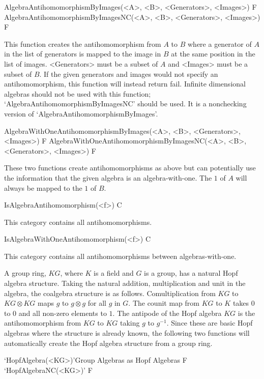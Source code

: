 \>AlgebraAntihomomorphismByImages(<A>, <B>, <Generators>, <Images>) F
\>AlgebraAntihomomorphismByImagesNC(<A>, <B>, <Generators>, <Images>) F

This function creates the antihomomorphism from $A$ to $B$
where a generator of $A$ in the list of generators is mapped to the image in $B$ at the same
position in the list of images.  <Generators> must be a subset of $A$ and <Images> must be a subset of $B$.
If the given generators and images would not specify an antihomomorphism, this function will instead return fail.
Infinite dimensional algebras should not be used with this function; `AlgebraAntihomomorphismByImagesNC' should be used.
  It is a nonchecking version of `AlgebraAntihomomorphismByImages'.

\>AlgebraWithOneAntihomomorphismByImages(<A>, <B>, <Generators>, <Images>) F
\>AlgebraWithOneAntihomomorphismByImagesNC(<A>, <B>, <Generators>, <Images>) F

These two functions create antihomomorphisms as above but can potentially use the information that the given algebra is an algebra-with-one.
The $1$ of $A$ will always be mapped to the $1$ of $B$.


\>IsAlgebraAntihomomorphism(<f>) C

This category contains all antihomomorphisms.

\>IsAlgebraWithOneAntihomomorphism(<f>) C

This category contains all antihomomorphisms between algebras-with-one.


A group ring, $KG$, where $K$ is a field and $G$ is a group, has a natural
Hopf algebra structure.  Taking the natural addition, multiplication
and unit in the algebra, the coalgebra structure is as follows.
Comultiplication from $KG$ to $KG \otimes KG$ maps $g$ to $g \otimes g$
for all $g$ in $G$.  The counit map from $KG$ to $K$ takes $0$ to $0$
and all non-zero elements to $1$.  The antipode of the Hopf algebra
$KG$ is the antihomomorphism from $KG$ to $KG$ taking $g$ to $g^{-1}$.
Since these are basic Hopf algebras where the structure is already known,
the following two functions will automatically create the Hopf algebra
structure from a group ring.

\>`HopfAlgebra(<KG>)'{Group Algebras as Hopf Algebras}  F
\>`HopfAlgebraNC(<KG>)' F

